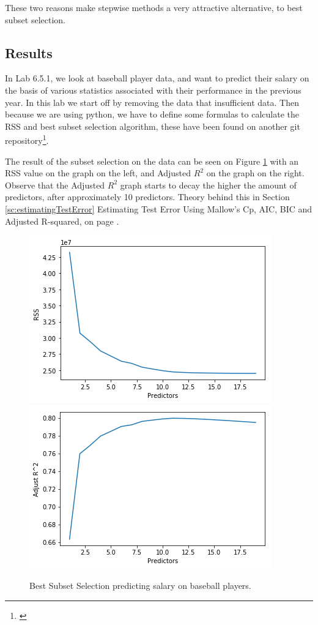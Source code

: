 These two reasons make stepwise methods a very attractive alternative, to best subset selection. 

\subsection{Results}
In Lab 6.5.1, we look at baseball player data, and want to predict their salary on the basis of various statistics associated with their performance in the previous year. In this lab we start off by removing the data that insufficient data. Then because we are using python, we have to define some formulas to calculate the RSS and best subset selection algorithm, these have been found on another git repository\footnote{\cite{Xu2017}}.

The result of the subset selection on the data can be seen on Figure \ref{fig:bestSubsetSelection} with an RSS value on the graph on the left, and Adjusted $R^2$ on the graph on the right. Observe that the Adjusted $R^2$ graph starts to decay the higher the  amount of predictors, after approximately 10 predictors. Theory behind this in Section \ref{sc:estimatingTestError} Estimating Test Error Using Mallow's Cp, AIC, BIC and Adjusted R-squared, on page \pageref{sc:estimatingTestError}.

\begin{figure}[h]
	\centering
	\includegraphics[scale=0.5]{subsetSelection/selectionMethods/fig/bestSubsetSelectionRSS.png}
	\includegraphics[scale=0.5]{subsetSelection/selectionMethods/fig/bestSubsetSelectionRsquared.png}
	\caption{Best Subset Selection predicting salary on baseball players.}
	\label{fig:bestSubsetSelection}
\end{figure}


